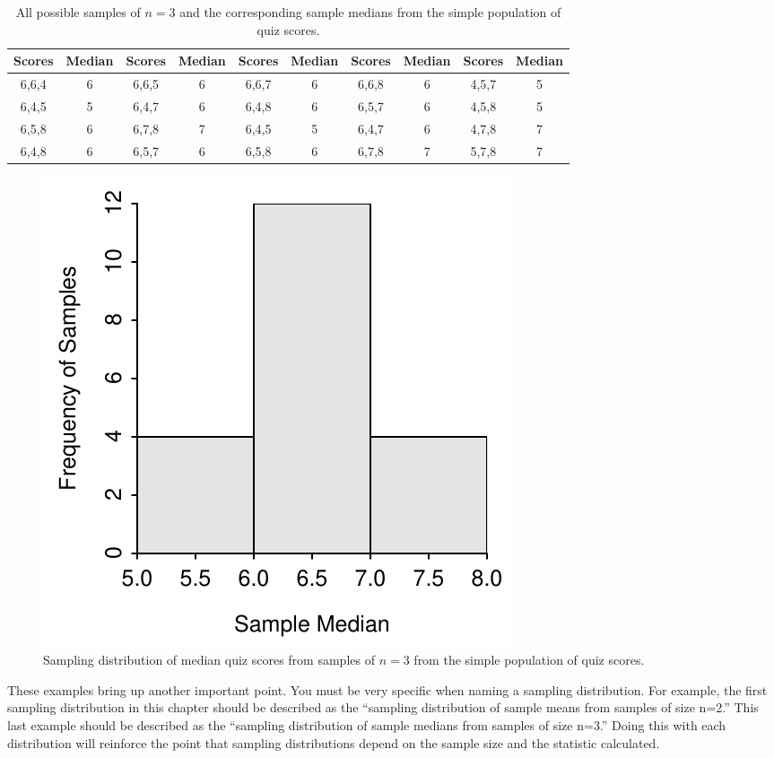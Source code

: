 \documentclass[10pt,openany]{book}\usepackage[]{graphicx}\usepackage[]{color}
\newenvironment{knitrout}{}{} %
\begin{document}
\begin{table}[htbp]
  \caption{All possible samples of $n=3$ and the corresponding sample medians from the simple population of quiz scores.}
  \label{tab:SDistQuizMdns3}
  \centering
    \begin{tabular}{cc||cc||cc||cc||cc}
\hline\hline
Scores & Median & Scores & Median & Scores &  Median & Scores & Median & Scores & Median \\
\hline
6,6,4 & 6 & 6,6,5 & 6 & 6,6,7 & 6 & 6,6,8 & 6 & 4,5,7 & 5 \\
6,4,5 & 5 & 6,4,7 & 6 & 6,4,8 & 6 & 6,5,7 & 6 & 4,5,8 & 5 \\
6,5,8 & 6 & 6,7,8 & 7 & 6,4,5 & 5 & 6,4,7 & 6 & 4,7,8 & 7 \\
6,4,8 & 6 & 6,5,7 & 6 & 6,5,8 & 6 & 6,7,8 & 7 & 5,7,8 & 7 \\
\hline\hline
    \end{tabular}
\end{table}

\begin{knitrout}
\color{fgcolor}\begin{figure}[hbtp]

{\centering \includegraphics[width=.4\linewidth]{Figs/SDistQuizMdns3-1} 

}

\caption[Sampling distribution of median quiz scores from samples of $n=3$ from the simple population of quiz scores]{Sampling distribution of median quiz scores from samples of $n=3$ from the simple population of quiz scores.}\label{fig:SDistQuizMdns3}
\end{figure}


\end{knitrout}


These examples bring up another important point.  You must be very specific when naming a sampling distribution.  For example, the first sampling distribution in this chapter should be described as the ``sampling distribution of sample means from samples of size n=2.''  This last example should be described as the ``sampling distribution of sample medians from samples of size n=3.''  Doing this with each distribution will reinforce the point that sampling distributions depend on the sample size and the statistic calculated.
\end{document}
